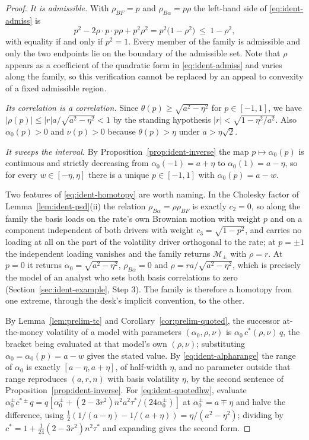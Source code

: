 \documentclass[../../../main.tex]{subfiles}
\begin{document}
\begin{proof}
\emph{It is admissible.} With $\rho_{BF}=p$ and $\rho_{B\alpha}=p\rho$ the left-hand side of \eqref{eq:ident-admiss} is
\[
p^2-2\rho\cdot p\cdot p\rho+p^2\rho^2=p^2\big(1-\rho^2\big)\ \le\ 1-\rho^2 ,
\]
with equality if and only if $p^2=1$. Every member of the family is admissible and only the two endpoints lie on the boundary of the admissible set. Note that $\rho$ appears as a coefficient of the quadratic form in \eqref{eq:ident-admiss} and varies along the family, so this verification cannot be replaced by an appeal to convexity of a fixed admissible region.

\emph{Its correlation is a correlation.} Since $\theta(p)\ge\sqrt{a^2-\eta^2}$ for $p\in[-1,1]$, we have $|\rho(p)|\le|r|a/\sqrt{a^2-\eta^2}<1$ by the standing hypothesis $|r|<\sqrt{1-\eta^2/a^2}$. Also $\alpha_0(p)>0$ and $\nu(p)>0$ because $\theta(p)>\eta$ under $a>\eta\sqrt2$.

\emph{It sweeps the interval.} By Proposition~\ref{prop:ident-inverse} the map $p\mapsto\alpha_0(p)$ is continuous and strictly decreasing from $\alpha_0(-1)=a+\eta$ to $\alpha_0(1)=a-\eta$, so for every $w\in[-\eta,\eta]$ there is a unique $p\in[-1,1]$ with $\alpha_0(p)=a-w$.

Two features of \eqref{eq:ident-homotopy} are worth naming. In the Cholesky factor of Lemma~\ref{lem:ident-psd}(ii) the relation $\rho_{B\alpha}=\rho\rho_{BF}$ is exactly $c_2=0$, so along the family the basis loads on the rate's own Brownian motion with weight $p$ and on a component independent of both drivers with weight $c_3=\sqrt{1-p^2}$, and carries no loading at all on the part of the volatility driver orthogonal to the rate; at $p=\pm1$ the independent loading vanishes and the family returns $\mathcal M_\pm$ with $\rho=r$. At $p=0$ it returns $\alpha_0=\sqrt{a^2-\eta^2}$, $\rho_{B\alpha}=0$ and $\rho=ra/\sqrt{a^2-\eta^2}$, which is precisely the model of an analyst who sets both basis correlations to zero (Section~\ref{sec:ident-example}, Step 3). The family is therefore a homotopy from one extreme, through the desk's implicit convention, to the other.

By Lemma~\ref{lem:prelim-tc} and Corollary~\ref{cor:prelim-quoted}, the successor at-the-money volatility of a model with parameters $(\alpha_0,\rho,\nu)$ is $\alpha_0\,c^*(\rho,\nu)\,q$, the bracket being evaluated at that model's own $(\rho,\nu)$; substituting $\alpha_0=\alpha_0(p)=a-w$ gives the stated value. By \eqref{eq:ident-alpharange} the range of $\alpha_0$ is exactly $[a-\eta,a+\eta]$, of half-width $\eta$, and no parameter outside that range reproduces $(a,r,n)$ with basis volatility $\eta$, by the second sentence of Proposition~\ref{prop:ident-inverse}. For \eqref{eq:ident-quotedhw}, evaluate $\alpha_0^{\pm}c^{*\pm}q=q[\alpha_0^{\pm}+(2-3r^2)n^2a^2\tau^*/(24\alpha_0^{\pm})]$ at $\alpha_0^{\pm}=a\mp\eta$ and halve the difference, using $\tfrac12(1/(a-\eta)-1/(a+\eta))=\eta/(a^2-\eta^2)$; dividing by $c^*=1+\tfrac1{24}(2-3r^2)n^2\tau^*$ and expanding gives the second form.


\end{proof}
\end{document}

